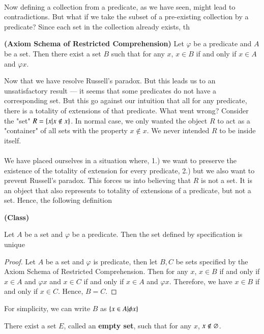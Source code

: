 ~\\
Now defining a collection from a predicate, as we have seen, might lead to contradictions. But what if we take the subset of a pre-existing collection by a predicate? Since each set in the collection already exists, th
\begin{ax}
    \textbf{(Axiom Schema of Restricted Comprehension)} Let $\varphi$ be a predicate and $A$ be a set. Then there exist a set $B$ such that for any $x$, $x\in B$ if and only if $x\in A$ and $\varphi x$. 
\end{ax}
Now that we have resolve Russell's paradox. But this leads us to an unsatisfactory result --- it seems that some predicates do not have a corresponding set. But this go against our intuition that all for any predicate, there is a totality of extensions of that predicate. What went wrong? Consider the "set" $R = \{x|x\not\in x\}$. In normal case, we only wanted the object $R$ to act as a "container" of all sets with the property $x\not\in x$. We never intended $R$ to be inside itself.\\
~\\
We have placed ourselves in a situation where, 1.) we want to preserve the existence of the totality of extension for every predicate, 2.) but we also want to prevent Russell's paradox. This forces us into believing that $R$ is not a set. It is an object that also represents to totality of extensions of a predicate, but not a set. Hence, the following definition
\begin{defn}
    \textbf{(Class)} 
\end{defn}
\begin{prop}
    Let $A$ be a set and $\varphi$ be a predicate. Then the set defined by specification is unique
\end{prop}
\begin{proof}
    Let $A$ be a set and $\varphi$ is predicate, then let $B,C$ be sets specified by the Axiom Schema of Restricted Comprehension. Then for any $x$, $x\in B$ if and only if $x\in A$ and $\varphi x$ and $x\in C$ if and only if $x\in A$ and $\varphi x$. Therefore, we have $x\in B$ if and only if $x\in C$. Hence, $B=C$.
\end{proof}
\begin{rem}
    For simplicity, we can write $B$ as $\{x\in A|\phi x\}$
\end{rem}
\begin{thm}
    There exist a set $E$, called an \textbf{empty set}, such that for any $x$, $x\not\in \varnothing$. 
\end{thm}
